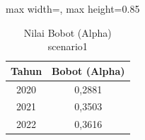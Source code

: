 \begin{table}[H]
\centering
\caption{Nilai Bobot (Alpha) scenario1} \label{tab:sample1alpha}
\begin{adjustbox}{max width=\textwidth, max height=0.85\textheight}
\begin{tabular}{|c|c|}
\hline
\textbf{Tahun} & \textbf{Bobot (Alpha)} \\
\hline
2020 & 0,2881 \\
2021 & 0,3503 \\
2022 & 0,3616 \\
\hline
\end{tabular}
\end{adjustbox}
\end{table}